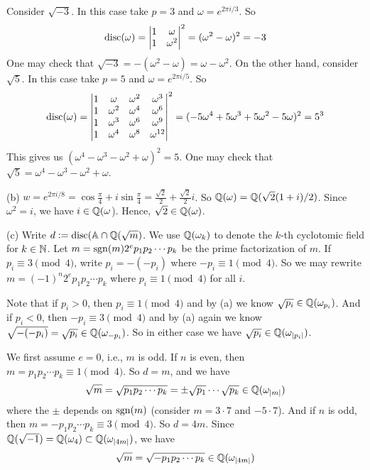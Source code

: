 \documentclass[../Marcus.tex]{subfiles}
\begin{document}
Consider $\sqrt{-3}$. In this case take $p=3$ and $\omega=e^{2\pi i/3}$. So
$$
\operatorname{disc}(\omega)=
\begin{vmatrix}
    1 & \omega \\
    1 & \omega^2
\end{vmatrix}^2
=(\omega^2-\omega)^2=-3
$$
One may check that $\sqrt{-3}=-(\omega^2-\omega)=\omega-\omega^2$.
On the other hand, consider $\sqrt{5}$. In this case take $p=5$ and $\omega=e^{2\pi i/5}$. So
$$\operatorname{disc}(\omega)=
\begin{vmatrix}
    1 & \omega & \omega^2 & \omega^3 \\
    1 & \omega^2 & \omega^4 & \omega^6 \\
    1 & \omega^3 & \omega^6 & \omega^9 \\
    1 & \omega^4 & \omega^8 & \omega^{12} 
\end{vmatrix}^2
=(-5\omega^4+5\omega^3+5\omega^2-5\omega)^2=5^3
$$
This gives us $(\omega^4-\omega^3-\omega^2+\omega)^2=5$. One may check that $\sqrt{5}=\omega^4-\omega^3-\omega^2+\omega$.

(b) $w=e^{2\pi i/8}=\cos\frac{\pi}{4}+i\sin\frac{\pi}{4}=\frac{\sqrt{2}}{2}+\frac{\sqrt{2}}{2}i$. So $\mathbb{Q}(\omega)=\mathbb{Q}(\sqrt{2}(1+i)/2)$. Since $\omega^2=i$, we have $i\in\mathbb{Q}(\omega$). Hence, $\sqrt{2}\in\mathbb{Q}(\omega)$. 

(c) Write $d:=\operatorname{disc}(\mathbb{A}\cap\mathbb{Q}(\sqrt{m})$. We use $\mathbb{Q}(\omega_k)$ to denote the $k$-th cyclotomic field for $k\in\mathbb{N}$. Let $m=\operatorname{sgn}(m)2^ep_1p_2\cdots p_k$ be the prime factorization of $m$. If $p_i\equiv 3 \pmod{4}$, write $p_i=-(-p_i)$ where $-p_i\equiv 1 \pmod{4}$. So we may rewrite $m=(-1)^n2^ep_1p_2\cdots p_k$ where $p_i\equiv 1 \pmod{4}$ for all $i$.

Note that if $p_i>0$, then $p_i\equiv 1 \pmod{4}$ and by (a) we know $\sqrt{p_i}\in\mathbb{Q}(\omega_{p_i})$. And if $p_i<0$, then $-p_i\equiv 3 \pmod{4}$ and by (a) again we know $\sqrt{-(-p_i)}=\sqrt{p_i} \in\mathbb{Q}(\omega_{-p_i})$. So in either case we have $\sqrt{p_i}\in\mathbb{Q}(\omega_{|p_i|})$.

We first assume $e=0$, i.e., $m$ is odd. If $n$ is even, then $m=p_1p_2\cdots p_k\equiv 1 \pmod{4}$. So $d=m$, and we have
$$\sqrt{m}=\sqrt{p_1p_2\cdots p_k}=\pm \sqrt{p_1}\cdots \sqrt{p_k}\in\mathbb{Q}(\omega_{|m|})$$ where the $\pm$ depends on $\operatorname{sgn}(m)$ (consider $m=3\cdot7$ and $-5\cdot7$). And if $n$ is odd, then $m=-p_1p_2\cdots p_k\equiv 3 \pmod{4}$. So $d=4m$. Since $\mathbb{Q}(\sqrt{-1})=\mathbb{Q}(\omega_4)\subset\mathbb{Q}(\omega_{|4m|})$, we have $$\sqrt{m}=\sqrt{-p_1p_2\cdots p_k}\in\mathbb{Q}(\omega_{|4m|})$$
\end{document}
